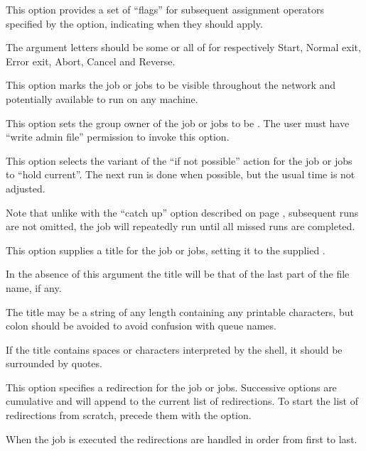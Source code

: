 
This option provides a set of ``flags'' for subsequent assignment operators specified by the  option, indicating when they
should apply.

The argument letters should be some or all of  for respectively Start, Normal exit, Error exit, Abort, Cancel and Reverse.


This option marks the job or jobs to be visible throughout the network and potentially available to run on any machine.


This option sets the group owner of the job or jobs to be . The user must have ``write admin file'' permission to invoke this option.


This option selects the variant of the ``if not possible'' action for the job or jobs to ``hold current''. The next run is done
when possible, but the usual time is not adjusted.

Note that unlike with the ``catch up'' option described on page \pageref{btr:catchup},
subsequent runs are not omitted, the job will repeatedly run until all missed runs are completed.


This option supplies a title for the job or jobs, setting it to the supplied .

In the absence of this argument the title will be that of the last part of the file name, if any.

The title may be a string of any length containing any printable characters, but colon should be
avoided to avoid confusion with queue names.

If the title contains spaces or characters interpreted by the shell, it should be surrounded by
quotes.


This option specifies a redirection for the job or jobs. Successive  options are cumulative and will append to
the current list of redirections. To start the list of redirections from scratch, precede them with the 
option.

When the job is executed the redirections are handled in order from first to last.

